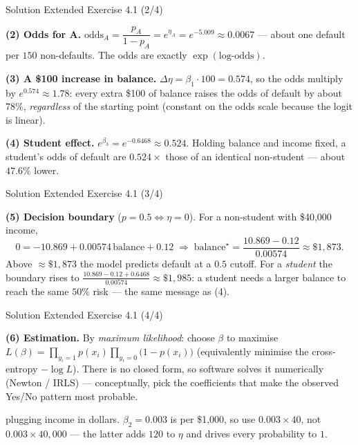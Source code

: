 \documentclass[aspectratio=169,11pt]{beamer}
\begin{document}
\begin{frame}{Solution \textemdash{} Extended Exercise 4.1 (2/4)}
\begin{solutionbox}
\textbf{(2) Odds for A.}
$\text{odds}_A=\dfrac{p_A}{1-p_A}=e^{\eta_A}=e^{-5.009}\approx 0.0067$ ---
about one default per $150$ non-defaults. The odds are exactly
$\exp(\text{log-odds})$.

\vspace{1mm}
\textbf{(3) A \$100 increase in balance.}
$\Delta\eta=\beta_1\cdot 100=0.574$, so the odds multiply by
$e^{0.574}\approx 1.78$: every extra \$100 of balance raises the odds of
default by about $78\%$, \emph{regardless} of the starting point
(constant on the odds scale because the logit is linear).

\vspace{1mm}
\textbf{(4) Student effect.}
$e^{\beta_3}=e^{-0.6468}\approx 0.524$. Holding balance and income fixed,
a student's odds of default are $0.524\times$ those of an identical
non-student --- about $47.6\%$ lower.
\end{solutionbox}
\end{frame}

\begin{frame}{Solution \textemdash{} Extended Exercise 4.1 (3/4)}
\begin{solutionbox}
\textbf{(5) Decision boundary} ($p=0.5\iff\eta=0$). For a non-student with
\$40{,}000 income,
\[
  0=-10.869+0.00574\,\text{balance}+0.12
  \;\Rightarrow\;
  \text{balance}^\star=\frac{10.869-0.12}{0.00574}\approx \$1{,}873 .
\]
Above $\approx\$1{,}873$ the model predicts default at a $0.5$ cutoff. For
a \emph{student} the boundary rises to
$\frac{10.869-0.12+0.6468}{0.00574}\approx \$1{,}985$: a student needs a
larger balance to reach the same $50\%$ risk --- the same message as (4).

\vspace{1mm}
\end{solutionbox}
\end{frame}

\begin{frame}{Solution \textemdash{} Extended Exercise 4.1 (4/4)}
\begin{solutionbox}
\textbf{(6) Estimation.}
By \emph{maximum likelihood}: choose $\beta$ to maximise
$L(\beta)=\prod_{y_i=1}p(x_i)\prod_{y_i=0}\bigl(1-p(x_i)\bigr)$
(equivalently minimise the cross-entropy $-\log L$). There is no closed
form, so software solves it numerically (Newton / IRLS) --- conceptually,
pick the coefficients that make the observed Yes/No pattern most probable.
\end{solutionbox}
\begin{mistake}
plugging income in dollars. $\beta_2=0.003$ is
per \$1{,}000, so use $0.003\times 40$, not $0.003\times 40{,}000$ ---
the latter adds $120$ to $\eta$ and drives every probability to $1$.
\end{mistake}
\end{frame}
\end{document}
